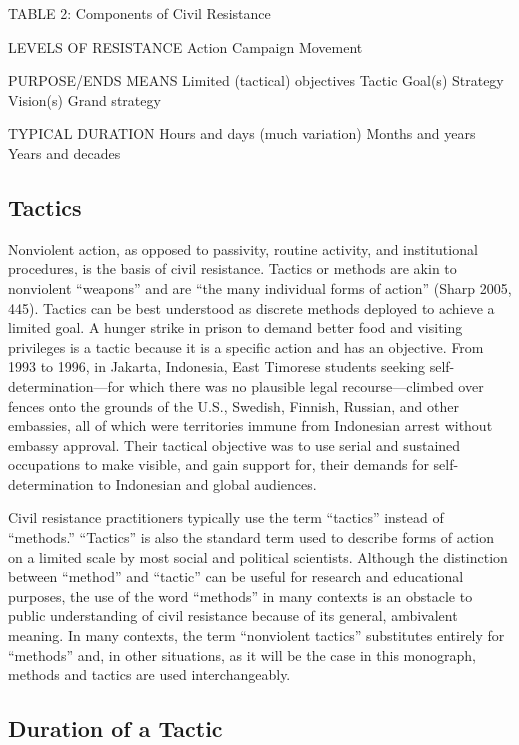 \documentclass[twoside,a4paper,12pt,fleqn,openany]{extbook}
\begin{document}
TABLE 2: Components of Civil Resistance

LEVELS OF RESISTANCE
Action
Campaign
Movement

PURPOSE/ENDS
MEANS
Limited (tactical) objectives
Tactic
Goal(s)
Strategy
Vision(s)
Grand strategy

TYPICAL DURATION
Hours and days (much variation)
Months and years
Years and decades

\subsection*{Tactics}

Nonviolent action, as opposed to passivity, routine activity, and institutional procedures, is the basis of civil resistance. Tactics or methods are akin to nonviolent “weapons” and are “the many individual forms of action” (Sharp 2005, 445). Tactics can be best understood as discrete methods deployed to achieve a limited goal. A hunger strike in prison to demand better food and visiting privileges is a tactic because it is a specific action and has an objective. From 1993 to 1996, in Jakarta, Indonesia, East Timorese students seeking self-determination—for which there was no plausible legal recourse—climbed over fences onto the grounds of the U.S., Swedish, Finnish, Russian, and other embassies, all of which were territories immune from Indonesian arrest without embassy approval. Their tactical objective was to use serial and sustained occupations to make visible, and gain support for, their demands for self-determination to Indonesian and global audiences.

Civil resistance practitioners typically use the term “tactics” instead of “methods.” “Tactics” is also the standard term used to describe forms of action on a limited scale by most social and political scientists. Although the distinction between “method” and “tactic” can be useful for research and educational purposes, the use of the word “methods” in many contexts is an obstacle to public understanding of civil resistance because of its general, ambivalent meaning. In many contexts, the term “nonviolent tactics” substitutes entirely for “methods” and, in other situations, as it will be the case in this monograph, methods and tactics are used interchangeably.

\subsection*{Duration of a Tactic}
\end{document}
